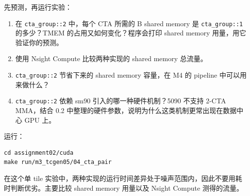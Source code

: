 \documentclass[11pt,a4paper,fontset=fandol]{ctexart}
\begin{document}
先预测，再运行实验：

\begin{enumerate}
\def\labelenumi{(\alph{enumi})}
\item
  在 \texttt{cta\_\allowbreak{}group:\allowbreak{}:\allowbreak{}2}
  中，每个 CTA 所需的 B shared memory 是
  \texttt{cta\_\allowbreak{}group:\allowbreak{}:\allowbreak{}1}
  的多少？TMEM 的占用又如何变化？程序会打印 shared memory
  用量，用它验证你的预测。
\item
  使用 Nsight Compute 比较两种实现的 shared memory 总流量。
\item
  \texttt{cta\_\allowbreak{}group:\allowbreak{}:\allowbreak{}2}
  节省下来的 shared memory 容量，在 M4 的 pipeline 中可以用来做什么？
\item
  \texttt{cta\_\allowbreak{}group:\allowbreak{}:\allowbreak{}2} 依赖
  sm90 引入的哪一种硬件机制？5090 不支持 2-CTA MMA，结合 0.2
  中整理的硬件参数，说明为什么这类机制更常出现在数据中心 GPU 上。
\end{enumerate}

运行：

\begin{verbatim}
cd assignment02/cuda
make run/m3_tcgen05/04_cta_pair
\end{verbatim}

在这个单 tile
实验中，两种实现的运行时间差异处于噪声范围内，因此不要用耗时判断优劣。主要比较
shared memory 用量以及 Nsight Compute 测得的流量。
\end{document}
